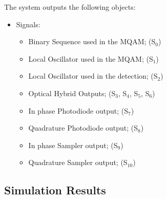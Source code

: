 The system outputs the following objects:
\begin{itemize}
\item Signals:
\begin{itemize}
\item Binary Sequence used in the MQAM; (S$_{0}$)
\item Local Oscillator used in the MQAM; (S$_{1}$)
\item Local Oscillator used in the detection; (S$_{2}$)
\item Optical Hybrid Outputs; (S$_{3}$, S$_{4}$, S$_{5}$, S$_{6}$)
\item In phase Photodiode output; (S$_{7}$)
\item Quadrature Photodiode output; (S$_{8}$)
\item In phase Sampler output; (S$_{9}$)
\item Quadrature Sampler output; (S$_{10}$)
\end{itemize}
\end{itemize}	

\subsection*{Simulation Results}\label{subsec:SHresults}

